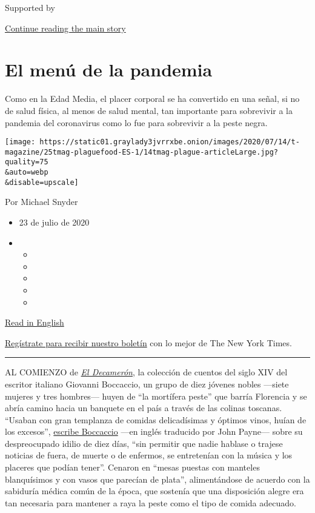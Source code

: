 Supported by

\protect\hyperlink{after-sponsor}{Continue reading the main story}

\hypertarget{el-menuxfa-de-la-pandemia}{%
\section{El menú de la pandemia}\label{el-menuxfa-de-la-pandemia}}

Como en la Edad Media, el placer corporal se ha convertido en una señal,
si no de salud física, al menos de salud mental, tan importante para
sobrevivir a la pandemia del coronavirus como lo fue para sobrevivir a
la peste negra.

\texttt{[image: https://static01.graylady3jvrrxbe.onion/images/2020/07/14/t-magazine/25tmag-plaguefood-ES-1/14tmag-plague-articleLarge.jpg?quality=75\\\&auto=webp\\\&disable=upscale]}

Por Michael Snyder

\begin{itemize}
\item
  23 de julio de 2020
\item
  \begin{itemize}
  \item
  \item
  \item
  \item
  \item
  \end{itemize}
\end{itemize}

\href{https://www.nytimes3xbfgragh.onion/2020/07/16/t-magazine/eating-food-during-plague.html}{Read
in English}

\href{https://www.nytimes3xbfgragh.onion/newsletters/el-times}{Regístrate
para recibir nuestro boletín} con lo mejor de The New York Times.

\begin{center}\rule{0.5\linewidth}{\linethickness}\end{center}

AL COMIENZO de
\href{https://www.nytimes3xbfgragh.onion/interactive/2020/07/07/magazine/decameron-project-short-story-collection.html}{\emph{El
Decamerón}}, la colección de cuentos del siglo XIV del escritor italiano
Giovanni Boccaccio, un grupo de diez jóvenes nobles ---siete mujeres y
tres hombres--- huyen de ``la mortífera peste'' que barría Florencia y
se abría camino hacia un banquete en el país a través de las colinas
toscanas. ``Usaban con gran templanza de comidas delicadísimas y óptimos
vinos, huían de los excesos'',
\href{https://www.alianzaeditorial.es/primer_capitulo/decameron.pdf}{escribe
Boccaccio} ---en inglés traducido por John Payne--- sobre su
despreocupado idilio de diez días, ``sin permitir que nadie hablase o
trajese noticias de fuera, de muerte o de enfermos, se entretenían con
la música y los placeres que podían tener''. Cenaron en ``mesas puestas
con manteles blanquísimos y con vasos que parecían de plata'',
alimentándose de acuerdo con la sabiduría médica común de la época, que
sostenía que una disposición alegre era tan necesaria para mantener a
raya la peste como el tipo de comida adecuado.

